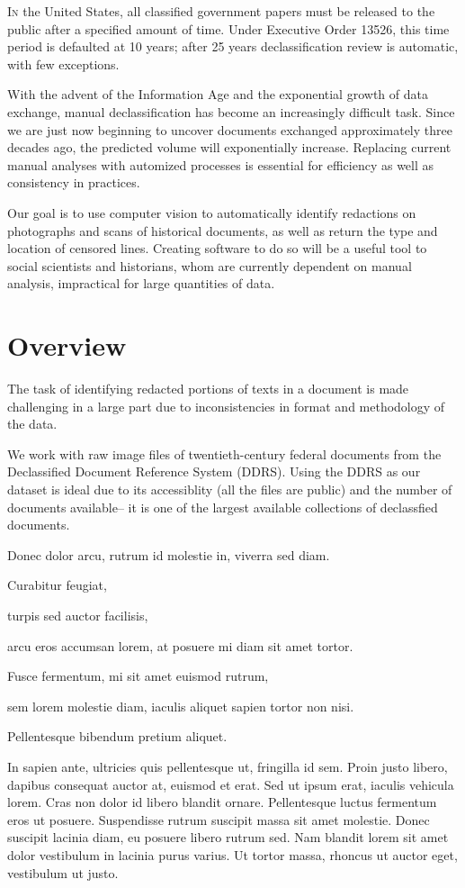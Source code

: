 \documentclass[twoside]{article}
\begin{document}
\begin{multicols}{2}
\lettrine[nindent=0em,lines=3]{I}n the United States, all classified government papers must be released to the public after a specified amount of time. Under Executive Order 13526, this time period is defaulted at 10 years; after 25 years declassification review is automatic, with few exceptions. 

With the advent of the Information Age and the exponential growth of data exchange, manual declassification has become an increasingly difficult task. Since we are just now beginning to uncover documents exchanged approximately three decades ago, the predicted volume will exponentially increase. Replacing current manual analyses with automized processes is essential for efficiency as well as consistency in practices.

Our goal is to use computer vision to automatically identify redactions on photographs and scans of historical documents, as well as return the type and location of censored lines. Creating software to do so will be a useful tool to social scientists and historians, whom are currently dependent on manual analysis, impractical for large quantities of data.

\section{Overview}

The task of identifying redacted portions of texts in a document is made challenging in a large part due to inconsistencies in format and methodology of the data.

We work with raw image files of twentieth-century federal documents from the Declassified Document Reference System (DDRS). Using the DDRS as our dataset is ideal due to its accessiblity (all the files are public) and the number of documents available-- it is one of the largest available collections of declassfied documents.

\begin{compactitem}
\item Donec dolor arcu, rutrum id molestie in, viverra sed diam.
\item Curabitur feugiat, 
\item turpis sed auctor facilisis, 
\item arcu eros accumsan lorem, at posuere mi diam sit amet tortor. 
\item Fusce fermentum, mi sit amet euismod rutrum, 
\item sem lorem molestie diam, iaculis aliquet sapien tortor non nisi. \item Pellentesque bibendum pretium aliquet. 
\end{compactitem}
In sapien ante, ultricies quis pellentesque ut, fringilla id sem. Proin justo libero, dapibus consequat auctor at, euismod et erat. Sed ut ipsum erat, iaculis vehicula lorem. Cras non dolor id libero blandit ornare. Pellentesque luctus fermentum eros ut posuere. Suspendisse rutrum suscipit massa sit amet molestie. Donec suscipit lacinia diam, eu posuere libero rutrum sed. Nam blandit lorem sit amet dolor vestibulum in lacinia purus varius. Ut tortor massa, rhoncus ut auctor eget, vestibulum ut justo.


\end{multicols}
\end{document}
